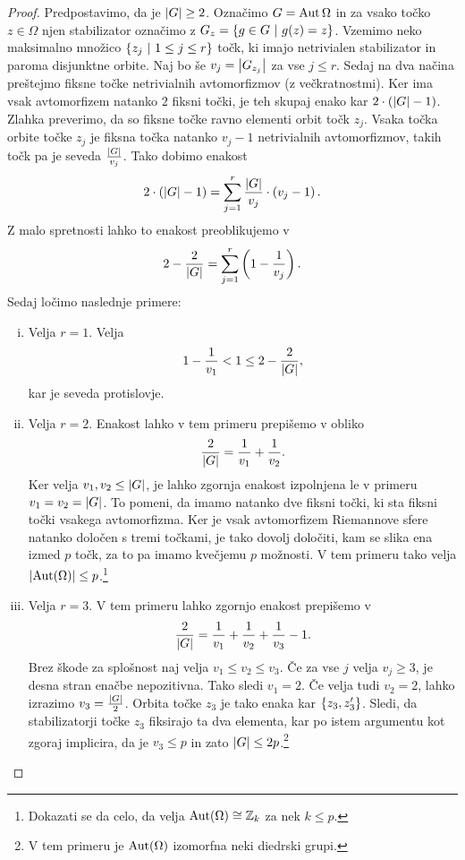 \begin{proof}
Predpostavimo, da je $\left\lvert G\right\rvert \geq 2$. Označimo $G = \operatorname{Aut} \Omega$
in za vsako točko $z \in \Omega$ njen stabilizator označimo z
$G_z = \left\{g \in G~\middle\vert~g(z) = z\right\}$. Vzemimo neko maksimalno množico
$\left\{z_j~\middle\vert~1 \leq j \leq r\right\}$ točk, ki imajo netrivialen
stabilizator in paroma disjunktne orbite. Naj bo še
$v_j = \left\lvert G_{z_j}\right\rvert$ za vse $j \leq r$. Sedaj na dva načina
preštejmo fiksne točke netrivialnih avtomorfizmov (z
večkratnostmi). Ker ima vsak avtomorfizem natanko $2$ fiksni točki,
je teh skupaj enako kar $2 \cdot \left(\left\lvert G\right\rvert - 1\right)$. Zlahka
preverimo, da so fiksne točke ravno elementi orbit točk $z_j$.
Vsaka točka orbite točke $z_j$ je fiksna točka natanko $v_j - 1$
netrivialnih avtomorfizmov, takih točk pa je seveda
$\frac{\left\lvert G\right\rvert}{v_j}$. Tako dobimo enakost
\[
2 \cdot \left(\left\lvert G\right\rvert - 1\right) =
\sum_{j=1}^r \frac{\left\lvert G\right\rvert}{v_j} \cdot \left(v_j - 1\right).
\]
Z malo spretnosti lahko to enakost preoblikujemo v
\[
2 - \frac{2}{\left\lvert G\right\rvert} = \sum_{j=1}^r \left(1 - \frac{1}{v_j}\right).
\]
Sedaj ločimo naslednje primere:

\begin{enumerate}[i)]
\item Velja $r = 1$. Velja
\[
1 - \frac{1}{v_1} < 1 \leq 2 - \frac{2}{\left\lvert G\right\rvert},
\]
kar je seveda protislovje.

\item Velja $r = 2$. Enakost lahko v tem primeru prepišemo v obliko
\[
\frac{2}{\left\lvert G\right\rvert} = \frac{1}{v_1} + \frac{1}{v_2}.
\]
Ker velja $v_1, v_2 \leq \left\lvert G\right\rvert$, je lahko zgornja enakost
izpolnjena le v primeru $v_1 = v_2 = \left\lvert G\right\rvert$. To pomeni, da imamo
natanko dve fiksni točki, ki sta fiksni točki vsakega avtomorfizma.
Ker je vsak avtomorfizem Riemannove sfere natanko določen s tremi
točkami, je tako dovolj določiti, kam se slika ena izmed $p$ točk,
za to pa imamo kvečjemu $p$ možnosti. V tem primeru tako velja
$\left\lvert \operatorname{Aut}(\Omega)\right\rvert \leq p$.\footnote{Dokazati se da celo, da velja
$\operatorname{Aut}(\Omega) \cong \mathbb{Z}_k$ za nek $k \leq p$.}

\item Velja $r = 3$. V tem primeru lahko zgornjo enakost prepišemo
v
\[
\frac{2}{\left\lvert G\right\rvert} =
\frac{1}{v_1} + \frac{1}{v_2} + \frac{1}{v_3} - 1.
\]
Brez škode za splošnost naj velja $v_1 \leq v_2 \leq v_3$. Če za
vse $j$ velja $v_j \geq 3$, je desna stran enačbe nepozitivna. Tako
sledi $v_1 = 2$. Če velja tudi $v_2 = 2$, lahko izrazimo
$v_3 = \frac{\left\lvert G\right\rvert}{2}$. Orbita točke $z_3$ je tako enaka kar
$\left\{z_3, z_3'\right\}$. Sledi, da stabilizatorji točke $z_3$ fiksirajo
ta dva elementa, kar po istem argumentu kot zgoraj implicira, da je
$v_3 \leq p$ in zato $\left\lvert G\right\rvert \leq 2p$.\footnote{V tem primeru je
$\operatorname{Aut}(\Omega)$ izomorfna neki diedrski grupi.}


\end{enumerate}
\end{proof}
